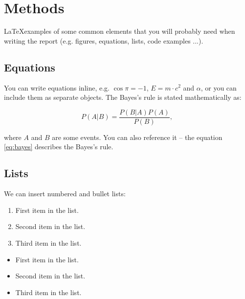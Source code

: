 \documentclass[fleqn,moreauthors,10pt]{ds_report}
\begin{document}

\section*{Methods}

\iffalse
\LaTeX examples of some common elements that you will probably need when writing the report (e.g. figures, equations, lists, code examples ...).

\subsection*{Equations}

You can write equations inline, e.g. $\cos\pi=-1$, $E = m \cdot c^2$ and $\alpha$, or you can include them as separate objects. The Bayes’s rule is stated mathematically as:

\begin{equation}
	P(A|B) = \frac{P(B|A)P(A)}{P(B)},
	\label{eq:bayes}
\end{equation}

where $A$ and $B$ are some events. You can also reference it -- the equation \ref{eq:bayes} describes the Bayes's rule.

\subsection*{Lists}

We can insert numbered and bullet lists:

\begin{enumerate}[noitemsep] 
	\item First item in the list.
	\item Second item in the list.
	\item Third item in the list.
\end{enumerate}

\begin{itemize}[noitemsep] 
	\item First item in the list.
	\item Second item in the list.
	\item Third item in the list.
\end{itemize}
\end{document}
